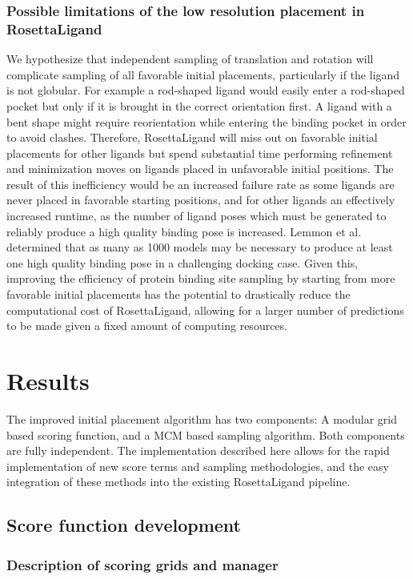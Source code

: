 \subsubsection{Possible limitations of the low resolution placement in RosettaLigand}
We hypothesize that independent sampling of translation and rotation will complicate sampling of all favorable initial placements, particularly if the ligand is not globular.
For example a rod-shaped ligand would easily enter a rod-shaped pocket but only if it is brought in the correct orientation first.
A ligand with a bent shape might require reorientation while entering the binding pocket in order to avoid clashes.
Therefore, RosettaLigand will miss out on favorable initial placements for other ligands but spend substantial time performing refinement and minimization moves on ligands placed in unfavorable initial positions.
The result of this inefficiency would be an increased failure rate as some ligands are never placed in favorable starting positions, and for other ligands an effectively increased runtime, as the number of ligand poses which must be generated to reliably produce a high quality binding pose is increased.
Lemmon et al. \citep{Lemmon:2013jd} determined that as many as 1000 models may be necessary to produce at least one high quality binding pose in a challenging docking case.
Given this, improving the efficiency of protein binding site sampling by starting from more favorable initial placements has the potential to drastically reduce the computational cost of RosettaLigand, allowing for a larger number of predictions to be made given a fixed amount of computing resources.

\section{Results}

The improved initial placement algorithm has two components: A modular grid based scoring function, and a \ac{MCM} based sampling algorithm.
Both components are fully independent.
The implementation described here allows for the rapid implementation of new score terms and sampling methodologies, and the easy integration of these methods into the existing RosettaLigand pipeline.

\subsection{Score function development}
\subsubsection{Description of scoring grids and manager}


